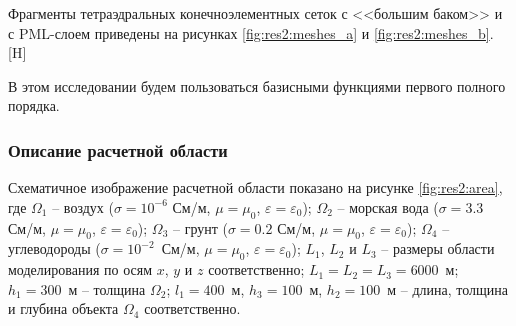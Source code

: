 \documentclass[a4paper,14pt]{article}
\makeatletter
\renewenvironment{figure}[1][\fps@figure]{
  \edef\@tempa{\noexpand\@float{figure}[#1]}
  \@tempa
  \addtocounter{foofigure}{1}
}{
  \end@float
}
\makeatother
\begin{document}
Фрагменты тетраэдральных конечноэлементных сеток с <<большим баком>> и с PML-слоем приведены на рисунках \ref{fig:res2:meshes_a} и \ref{fig:res2:meshes_b}.
\begin{figure}[H]
	\centering
	\caption{конечноэлементные сетки: (а) <<большой бак>> и (б) PML-слой}
	\label{fig:res2:meshes}
\end{figure}

В этом исследовании будем пользоваться базисными функциями первого полного порядка.

\subsubsection{Описание расчетной области}
Схематичное изображение расчетной области показано на рисунке \ref{fig:res2:area}, где $\Omega_1$ -- воздух ($\sigma=10^{-6}$ См/м, $\mu=\mu_0$, $\varepsilon=\varepsilon_0$); $\Omega_2$ -- морская вода ($\sigma=3.3$ См/м, $\mu=\mu_0$, $\varepsilon=\varepsilon_0$); $\Omega_3$ -- грунт ($\sigma=0.2$ См/м, $\mu=\mu_0$, $\varepsilon=\varepsilon_0$); $\Omega_4$ -- углеводороды ($\sigma=10^{-2}$~См/м, $\mu=\mu_0$, $\varepsilon=\varepsilon_0$); $L_1$, $L_2$ и $L_3$ -- размеры области моделирования по осям $x$, $y$ и $z$ соответственно; $L_1 = L_2 = L_3 = 6000$~м; $h_1=300$~м -- толщина $\Omega_2$; $l_1=400$~м, $h_3=100$~м, $h_2=100$~м -- длина, толщина и глубина объекта $\Omega_4$ соответственно.
\end{document}
